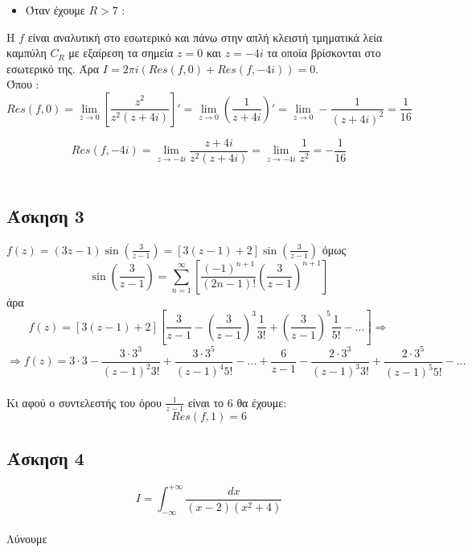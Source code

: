 \documentclass[12pt]{article}
\begin{document}
\begin{itemize}
\item Όταν έχουμε $R>7$ :
\end{itemize}

\newline
Η $f$ είναι αναλυτική στο εσωτερικό και πάνω  στην απλή κλειστή τμηματικά λεία καμπύλη $C_{R}$ με εξαίρεση τα σημεία $z=0$ και $ z=-4i$ τα οποία βρίσκονται στο εσωτερικό της. Άρα $Ι= 2 \pi i \left( Res(f,0)+ Res(f,-4i) \right)= 0 $.
\\
Όπου :$$ Res(f,0)= \lim_{z\to 0} \left[ \frac{z^2}{z^2(z+4i)} \right]'= \lim_{z\to 0} \left( \frac{1}{z+4i} \right)' = \lim_{z\to 0} - \frac{1}{(z+4i)^2} =\frac{1}{16} $$

$$ Res(f,-4i)= \lim_{z\to -4i}  \frac{z+4i}{z^2(z+4i)} = \lim_{z\to -4i}  \frac{1}{z^2} = -\frac{1}{16} $$
\\
 \subsection{Άσκηση 3}
$f(z)=(3z-1)\sin\left(\frac{3}{z-1}\right)=[3(z-1)+2]\sin\left(\frac{3}{z-1}\right)$
όμως
$$\sin\left(\frac{3}{z-1}\right)=\sum_{n=1}^{\infty} \left[ \frac{(-1)^{n+1}}{(2n-1)!}\left(\frac{3}{z-1}\right)^{n+1} \right] $$
άρα
$$ f(z)= [3(z-1)+2] \left[ \frac{3}{z-1} - \left(\frac{3}{z-1}\right)^3\frac{1}{3!} + \left(\frac{3}{z-1}\right)^5\frac{1}{5!} - ... \right] \Rightarrow $$
$$\Rightarrow f(z)=3\cdot3-\frac{3\cdot3^3}{(z-1)^2 3!} + \frac{3\cdot3^5}{(z-1)^4 5!}-...+\frac{6}{z-1}- \frac{2\cdot3^3}{(z-1)^3 3!}+ \frac{2\cdot3^5}{(z-1)^5 5!}-...$$
\\
Κι αφού ο συντελεστής του όρου $\frac{1}{z-1}$ είναι το $6$ θα έχουμε:
$$ Res(f,1)=6 $$



 \subsection{Άσκηση 4}
$$I= \int_{-\infty}^{+\infty} \frac{dx}{(x-2)(x^2+4)}$$
\\ Λύνουμε
\end{document}
